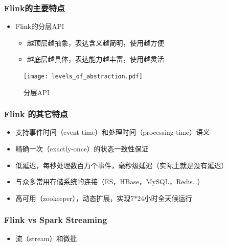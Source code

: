 \documentclass{beamer}
\begin{document}
  \begin{frame}
    \frametitle{Flink的主要特点}
  
    \begin{itemize}
      \item Flink的分层API
        \begin{itemize}
          \item 越顶层越抽象，表达含义越简明，使用越方便
          \item 越底层越具体，表达能力越丰富，使用越灵活
        \end{itemize}
    \end{itemize}

    \begin{figure}
      \centering
      \texttt{[image: levels\_of\_abstraction.pdf]}
      \caption{分层API}
    \end{figure}
  
  \end{frame}

  \begin{frame}
    \frametitle{Flink 的其它特点}

    \begin{itemize}
      \item 支持事件时间（event-time）和处理时间（processing-time）语义
      \item 精确一次（exactly-once）的状态一致性保证
      \item 低延迟，每秒处理数百万个事件，毫秒级延迟（实际上就是没有延迟）
      \item 与众多常用存储系统的连接（ES，HBase，MySQL，Redis…）
      \item 高可用（zookeeper），动态扩展，实现7*24小时全天候运行
    \end{itemize}
  
  \end{frame}

  \begin{frame}
    \frametitle{Flink vs Spark Streaming}
  
    \begin{itemize}
      \item 流（stream）和微批
    \end{itemize}
  
  \end{frame}
\end{document}
